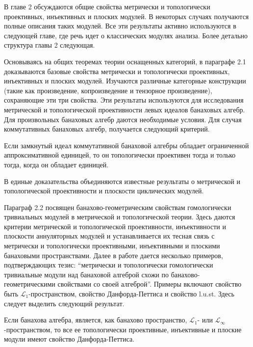 В главе 2 обсуждаются общие свойства метрически и топологически проективных, инъективных и плоских модулей. В некоторых случаях получаются полные описания таких модулей. Все эти результаты активно используются в следующей главе, где речь идет о классических модулях анализа. Более детально структура главы 2 следующая. 

Основываясь на общих теоремах теории оснащенных категорий, в параграфе 2.1 доказываются базовые свойства метрически и топологически проективных, инъективных и плоских модулей. Изучаются различные категорные конструкции (такие как произведение, копроизведение и тензорное произведение), сохраняющие эти три свойства. Эти результаты используются для исследования метрической и топологической проективности левых идеалов банаховых алгебр. Для произвольных банаховых алгебр даются необходимые условия. Для случая коммутативных банаховых алгебр, получается следующий критерий.

\begin{theorem*}[2.1.16] Если замкнутый идеал коммутативной банаховой алгебры обладает ограниченной аппроксимативной единицей, то он топологически проективен тогда и только тогда, когда он обладает единицей.
\end{theorem*} 

В единые доказательства объединяются известные результаты о метрической и топологической проективности и плоскости циклических модулей. 

Параграф 2.2 посвящен банахово-геометрическим свойствам гомологически тривиальных модулей в метрической и топологической теории. Здесь даются критерии метрической и топологической проективности, инъективности и плоскости аннуляторных модулей и устанавливается их тесная связь с метрически и топологически проективными, инъективными и плоскими банаховыми пространствами. Далее в работе дается несколько примеров, подтверждающих тезис: ``метрически и топологически гомологически тривиальные модули над банаховой алгеброй схожи по банахово-геометрическими свойствами со своей алгеброй''. Примеры включают свойство быть $\mathscr{L}_1$-пространством, свойство Данфорда-Петтиса и свойство l.u.st. Здесь следует выделить следующий результат.

\begin{theorem*}[2.2.13] Если банахова алгебра, является, как банахово пространство, $\mathscr{L}_1$- или $\mathscr{L}_\infty$-пространством, то все ее топологически проективные, инъективные и плоские модули имеют свойство Данфорда-Петтиса.
\end{theorem*}

